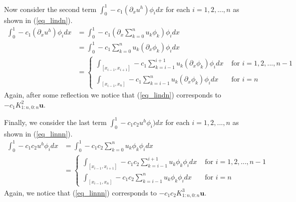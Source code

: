 \documentclass[11pt,fleqn]{article}
\theoremstyle{defstyle}
\begin{document}
Now consider the second term $\int_0^1  -c_1(\partial_xu^h)\phi_idx$  for each $i=1,2,...,n$ as shown in (\ref{eq_lindn}).
\begin{equation}
\begin{aligned}
\int_0^1 -c_1(\partial_xu^h)\phi_idx &= \int_0^1 - c_1(\partial_x \sum_{k=0}^{n} u_k\phi_k)\phi_i dx \\
&= \int_0^1 -c_1\sum_{k=0}^{n} u_k(\partial_x\phi_k)\phi_idx \\
&= \begin{cases}
\int_{[x_{i-1},x_{i+1}]}-c_1\sum_{k=i-1}^{i+1} u_k(\partial_x\phi_k)\phi_idx &\text{ for } i=1,2,..., n-1 \\
\int_{[x_{i-1},x_{n}]}-c_1\sum_{k=i-1}^{n} u_k(\partial_x\phi_k)\phi_idx &\text{ for } i=n
\end{cases}
\end{aligned}
\label{eq_lindn}
\end{equation}
Again, after some reflection we notice that (\ref{eq_lindn}) corresponds to $-c_1K^2_{1:n, 0:n}\mathbf{u}$. 

Finally, we consider the last term $\int_0^1 - c_1c_2u^h\phi_i)dx$ for each $i=1,2,...,n$ as shown in (\ref{eq_linnn}).
\begin{equation}
\begin{aligned}
\int_0^1 -c_1c_2u^h\phi_idx &= \int_0^1 - c_1c_2\sum_{k=0}^{n} u_k\phi_k\phi_i dx \\
&= \begin{cases}
\int_{[x_{i-1},x_{i+1}]}-c_1c_2\sum_{k=i-1}^{i+1} u_k\phi_k\phi_idx &\text{ for } i=1,2,..., n-1 \\
\int_{[x_{i-1},x_{n}]}-c_1c_2\sum_{k=i-1}^{n} u_k\phi_k\phi_idx &\text{ for } i=n
\end{cases}
\end{aligned}
\label{eq_linnn}
\end{equation}
Again, we notice that (\ref{eq_linnn}) corresponds to $-c_1c_2K^3_{1:n, 0:n}\mathbf{u}$.
\end{document}
